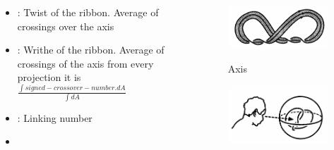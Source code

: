 \begin{frame}
	\begin{columns}[T]
		\begin{column}{.48\textwidth}
			\begin{itemize}
				\item {}: Twist of the ribbon. Average of crossings over the axis
				\item {}: Writhe of the ribbon. Average of crossings of the axis from every projection it is \\ \vspace{0.2cm} $\frac{\int signed-crossover-number.dA }{\int dA}$
				\item {}: Linking number
				\item {}
			\end{itemize}
		\end{column}
		\begin{column}{.48\textwidth}
			\begin{figure}
				\centering
				\includegraphics[width=0.6\linewidth]{images/ribbon.png}
				\caption{Axis}
				\label{axis}
				\cite{adams2004knot}
			\end{figure}
			\begin{figure}
				\centering
				\includegraphics[width=0.6\linewidth]{images/vantage.png}
				\label{vantage}
				\cite{adams2004knot}
			\end{figure}
		\end{column}
	\end{columns}
	
\end{frame}
